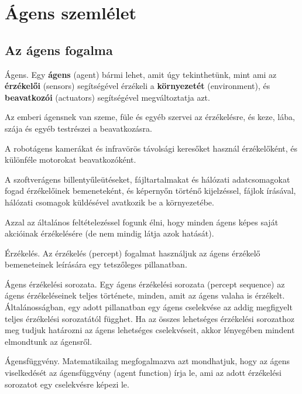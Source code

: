 \section{Ágens szemlélet}

\subsection{Az ágens fogalma}

\begin{definicio}
    Ágens.
    Egy \textbf{ágens} (agent) bármi lehet, amit úgy tekinthetünk, mint ami az
    \textbf{érzékelői} (sensors) segítségével érzékeli a \textbf{környezetét}
    (environment), és \textbf{beavatkozói} (actuators) segítségével
    megváltoztatja azt.

    Az emberi ágensnek van szeme, füle és egyéb szervei az érzékelésre, és keze,
    lába, szája és egyéb testrészei a beavatkozásra.

    A robotágens kamerákat és infravörös távolsági keresőket használ
    érzékelőként, és különféle motorokat beavatkozóként.

    A szoftverágens billentyűleütéseket, fájltartalmakat és hálózati
    adatcsomagokat fogad érzékelőinek bemeneteként, és képernyőn történő
    kijelzéssel, fájlok írásával, hálózati csomagok küldésével avatkozik be a
    környezetébe.

    Azzal az általános feltételezéssel fogunk élni, hogy minden ágens képes
    saját akcióinak érzékelésére (de nem mindig látja azok hatását).
\end{definicio}

\begin{definicio}
    Érzékelés.
    Az érzékelés (percept) fogalmat használjuk az ágens érzékelő bemeneteinek
    leírására egy tetszőleges pillanatban.
\end{definicio}

\begin{definicio}
    Ágens érzékelési sorozata.
    Egy ágens érzékelési sorozata (percept sequence) az ágens érzékeléseinek
    teljes története, minden, amit az ágens valaha is érzékelt. Általánosságban,
    egy adott pillanatban egy ágens cselekvése az addig megfigyelt teljes
    érzékelési sorozatától függhet. Ha az összes lehetséges érzékelési
    sorozathoz meg tudjuk határozni az ágens lehetséges cselekvéseit, akkor
    lényegében mindent elmondtunk az ágensről.
\end{definicio}

\begin{definicio}
    Ágensfüggvény.
    Matematikailag megfogalmazva azt mondhatjuk, hogy az ágens viselkedését az
    ágensfüggvény (agent function) írja le, ami az adott érzékelési sorozatot
    egy cselekvésre képezi le.
\end{definicio}

